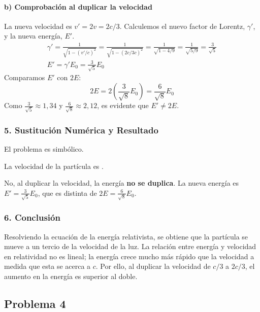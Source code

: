 \paragraph*{b) Comprobación al duplicar la velocidad}
La nueva velocidad es $v' = 2v = 2c/3$. Calculemos el nuevo factor de Lorentz, $\gamma'$, y la nueva energía, $E'$.
\begin{gather}
    \gamma' = \frac{1}{\sqrt{1 - (v'/c)^2}} = \frac{1}{\sqrt{1 - (2c/3c)^2}} = \frac{1}{\sqrt{1 - 4/9}} = \frac{1}{\sqrt{5/9}} = \frac{3}{\sqrt{5}} \\
    E' = \gamma' E_0 = \frac{3}{\sqrt{5}} E_0
\end{gather}
Comparamos $E'$ con $2E$:
$$ 2E = 2 \left( \frac{3}{\sqrt{8}} E_0 \right) = \frac{6}{\sqrt{8}} E_0 $$
Como $\frac{3}{\sqrt{5}} \approx 1,34$ y $\frac{6}{\sqrt{8}} \approx 2,12$, es evidente que $E' \neq 2E$.

\subsubsection*{5. Sustitución Numérica y Resultado}
El problema es simbólico.
\begin{cajaresultado}
    La velocidad de la partícula es .
\end{cajaresultado}
\begin{cajaresultado}
    No, al duplicar la velocidad, la energía \textbf{no se duplica}. La nueva energía es $E' = \frac{3}{\sqrt{5}}E_0$, que es distinta de $2E = \frac{6}{\sqrt{8}}E_0$.
\end{cajaresultado}

\subsubsection*{6. Conclusión}
\begin{cajaconclusion}
Resolviendo la ecuación de la energía relativista, se obtiene que la partícula se mueve a un tercio de la velocidad de la luz. La relación entre energía y velocidad en relatividad no es lineal; la energía crece mucho más rápido que la velocidad a medida que esta se acerca a $c$. Por ello, al duplicar la velocidad de $c/3$ a $2c/3$, el aumento en la energía es superior al doble.
\end{cajaconclusion}
\newpage
\subsection{Problema 4}
\label{subsec:P4_2020_jul_ext_b}

